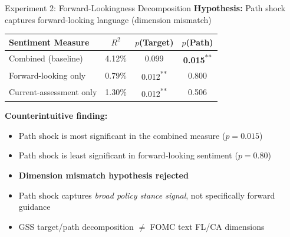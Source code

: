 \documentclass[aspectratio=169, 11pt]{beamer}
\begin{document}
\begin{frame}{Experiment 2: Forward-Lookingness Decomposition}
\textbf{Hypothesis:} Path shock captures forward-looking language (dimension mismatch)

\vspace{0.5em}
\begin{tabular}{lccc}
\toprule
Sentiment Measure & $R^2$ & $p$(Target) & $p$(Path) \\
\midrule
Combined (baseline) & 4.12\% & 0.099 & \textbf{0.015}\textsuperscript{**} \\
Forward-looking only & 0.79\% & 0.012\textsuperscript{**} & 0.800 \\
Current-assessment only & 1.30\% & 0.012\textsuperscript{**} & 0.506 \\
\bottomrule
\end{tabular}

\vspace{0.8em}
\textbf{Counterintuitive finding:}
\begin{itemize}
  \item Path shock is \alert{most significant} in the combined measure ($p = 0.015$)
  \item Path shock is \alert{least significant} in forward-looking sentiment ($p = 0.80$)
  \item \textbf{Dimension mismatch hypothesis rejected}
  \item Path shock captures \textit{broad policy stance signal}, not specifically forward guidance
  \item GSS target/path decomposition $\neq$ FOMC text FL/CA dimensions
\end{itemize}
\end{frame}
\end{document}
